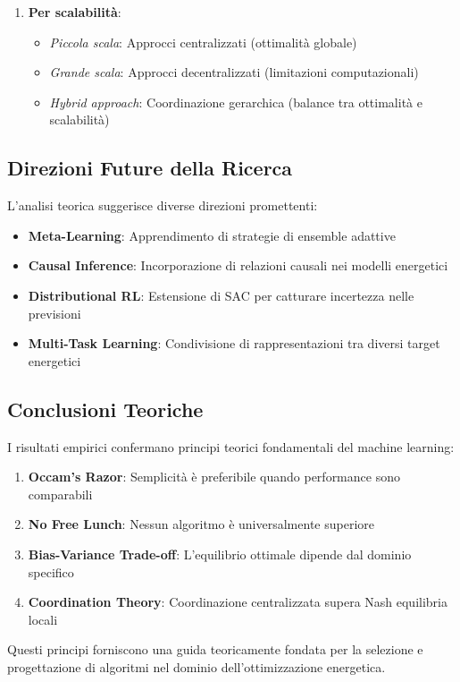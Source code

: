 \documentclass[12pt,a4paper,twoside]{report}
\begin{document}
\begin{appendices}
\begin{enumerate}
    \item \textbf{Per scalabilità}:
    \begin{itemize}
        \item \textit{Piccola scala}: Approcci centralizzati (ottimalità globale)
        \item \textit{Grande scala}: Approcci decentralizzati (limitazioni computazionali)
        \item \textit{Hybrid approach}: Coordinazione gerarchica (balance tra ottimalità e scalabilità)
    \end{itemize}
\end{enumerate}

\subsection{Direzioni Future della Ricerca}

L'analisi teorica suggerisce diverse direzioni promettenti:

\begin{itemize}
    \item \textbf{Meta-Learning}: Apprendimento di strategie di ensemble adattive
    \item \textbf{Causal Inference}: Incorporazione di relazioni causali nei modelli energetici  
    \item \textbf{Distributional RL}: Estensione di SAC per catturare incertezza nelle previsioni
    \item \textbf{Multi-Task Learning}: Condivisione di rappresentazioni tra diversi target energetici
\end{itemize}

\subsection{Conclusioni Teoriche}

I risultati empirici confermano principi teorici fondamentali del machine learning:
\begin{enumerate}
    \item \textbf{Occam's Razor}: Semplicità è preferibile quando performance sono comparabili
    \item \textbf{No Free Lunch}: Nessun algoritmo è universalmente superiore
    \item \textbf{Bias-Variance Trade-off}: L'equilibrio ottimale dipende dal dominio specifico
    \item \textbf{Coordination Theory}: Coordinazione centralizzata supera Nash equilibria locali
\end{enumerate}

Questi principi forniscono una guida teoricamente fondata per la selezione e progettazione di algoritmi nel dominio dell'ottimizzazione energetica.

\end{appendices}
\end{document}
